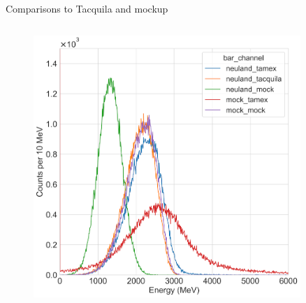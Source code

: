 \documentclass[compress, 13pt, aspectratio=169]{beamer}
\begin{document}
\begin{frame}{Comparisons to Tacquila and mockup}
\begin{columns}
\begin{column}{0.5\textwidth}
\begin{figure}[t]
                \includegraphics[keepaspectratio, width = 0.9\textwidth]{Plots/EtotAll_E1_4n.png}%
            \end{figure}
        \end{column}
    \end{columns}
\end{frame}
\end{document}
